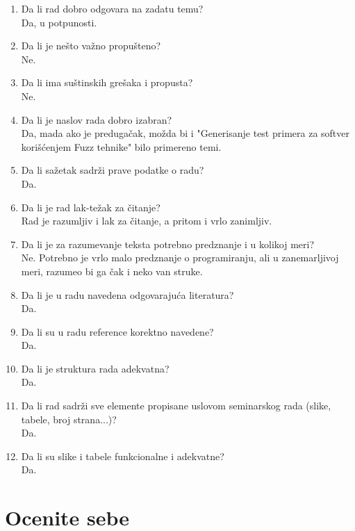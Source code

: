 \documentclass[a4paper]{report}
\begin{document}
\begin{enumerate}
\item Da li rad dobro odgovara na zadatu temu?\\
Da, u potpunosti.

\item Da li je nešto važno propušteno?\\
Ne.

\item Da li ima suštinskih grešaka i propusta?\\
Ne.

\item Da li je naslov rada dobro izabran?\\
Da, mada ako je predugačak, možda bi i "Generisanje test primera za softver korišćenjem Fuzz tehnike" bilo primereno temi.

\item Da li sažetak sadrži prave podatke o radu?\\
Da.

\item Da li je rad lak-težak za čitanje?\\
Rad je razumljiv i lak za čitanje, a pritom i vrlo zanimljiv.

\item Da li je za razumevanje teksta potrebno predznanje i u kolikoj meri?\\
Ne. Potrebno je vrlo malo predznanje o programiranju, ali u zanemarljivoj meri, razumeo bi ga čak i neko van struke.

\item Da li je u radu navedena odgovarajuća literatura?\\
Da.

\item Da li su u radu reference korektno navedene?\\
Da.

\item Da li je struktura rada adekvatna?\\
Da.

\item Da li rad sadrži sve elemente propisane uslovom seminarskog rada (slike, tabele, broj strana...)?\\
Da.

\item Da li su slike i tabele funkcionalne i adekvatne?\\
Da.
\end{enumerate}

\section{Ocenite sebe}
\end{document}
